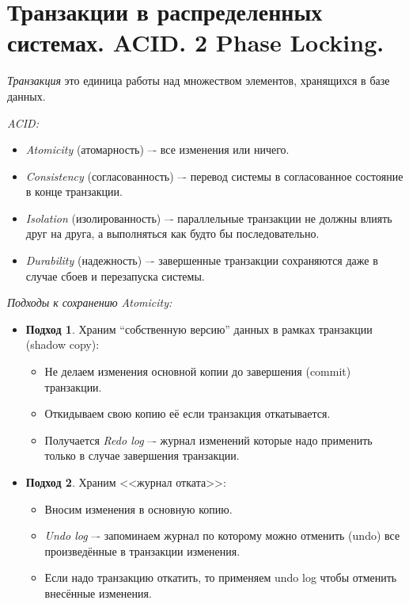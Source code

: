 \section{Транзакции в распределенных системах. ACID. 2 Phase Locking.}

\begin{definition}
    \textit{Транзакция} это единица работы над множеством элементов,
    хранящихся в базе данных.
\end{definition}

\begin{definition} \textit{ACID:}
    \begin{itemize}
        \item \textit{Atomicity} (атомарность) –- все изменения или ничего.
        \item \textit{Consistency} (согласованность) –- перевод системы в согласованное
            состояние в конце транзакции.
        \item \textit{Isolation} (изолированность) –- параллельные транзакции не
            должны влиять друг на друга, а выполняться как будто бы
            последовательно.
        \item \textit{Durability} (надежность) –- завершенные транзакции сохраняются
            даже в случае сбоев и перезапуска системы.
    \end{itemize}
\end{definition}

\begin{algorithm} \textit{Подходы к сохранению Atomicity:}
    \begin{itemize}
        \item \textbf{Подход 1}. Храним ``собственную версию'' данных в рамках 
            транзакции (shadow copy):
            \begin{itemize}
                \item Не делаем изменения основной копии до завершения (commit) 
                    транзакции.
                \item Откидываем свою копию её если транзакция откатывается.
                \item Получается \textit{Redo log} –- журнал изменений которые надо
                    применить только в случае завершения транзакции.
            \end{itemize}
        \item \textbf{Подход 2}. Храним <<журнал отката>>:
            \begin{itemize}
                \item Вносим изменения в основную копию.
                \item \textit{Undo log} –- запоминаем журнал по которому можно отменить
                    (undo) все произведённые в транзакции изменения.
                \item Если надо транзакцию откатить, то применяем undo log чтобы
                    отменить внесённые изменения.
            \end{itemize}
    \end{itemize}
\end{algorithm}

